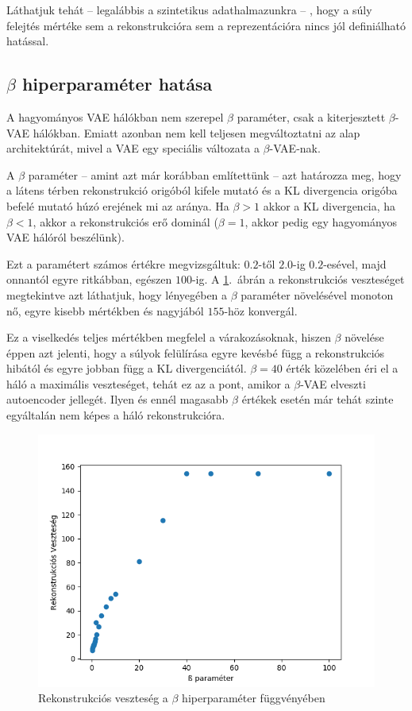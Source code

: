 Láthatjuk tehát -- legalábbis a szintetikus adathalmazunkra -- , hogy a súly felejtés mértéke sem a rekonstrukcióra sem a reprezentációra nincs jól definiálható hatással.

\subsection{$\beta$ hiperparaméter hatása}

A hagyományos VAE hálókban nem szerepel $\beta$ paraméter, csak a kiterjesztett $\beta$-VAE hálókban. Emiatt azonban nem kell teljesen megváltoztatni az alap architektúrát, mivel a VAE egy speciális változata a $\beta$-VAE-nak.

A $\beta$ paraméter -- amint azt már korábban említettünk -- azt határozza meg, hogy a látens térben rekonstrukció origóból kifele mutató és a KL divergencia origóba befelé mutató húzó erejének mi az aránya. Ha $\beta>1$ akkor a KL divergencia, ha $\beta<1$, akkor a rekonstrukciós erő dominál ($\beta=1$, akkor pedig egy hagyományos VAE hálóról beszélünk).

Ezt a paramétert számos értékre megvizsgáltuk: $0.2$-től $2.0$-ig $0.2$-esével, majd onnantól egyre ritkábban, egészen $100$-ig. A \ref{beta-loss}.~ábrán a rekonstrukciós veszteséget megtekintve azt láthatjuk, hogy lényegében a $\beta$ paraméter növelésével monoton nő, egyre kisebb mértékben és nagyjából $155$-höz konvergál. 

Ez a viselkedés teljes mértékben megfelel a várakozásoknak, hiszen $\beta$ növelése éppen azt jelenti, hogy a súlyok felülírása egyre kevésbé függ a rekonstrukciós hibától és egyre jobban függ a KL divergenciától. $\beta=40$ érték közelében éri el a háló a maximális veszteséget, tehát ez az a pont, amikor a $\beta$-VAE elveszti autoencoder jellegét. Ilyen és ennél magasabb $\beta$ értékek esetén már tehát szinte egyáltalán nem képes a háló rekonstrukcióra.

\begin{figure}[h!]
\begin{center}
  
  \includegraphics[width=0.75\linewidth]{metrics/vae_beta-loss.png}
  \caption{Rekonstrukciós veszteség a $\beta$ hiperparaméter függvényében}\label{beta-loss}
\end{center}
\end{figure}

